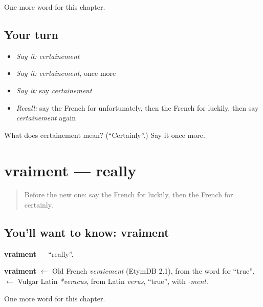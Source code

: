 \begin{grammarlens}[title={What you've built}]
One more word for this chapter.
\end{grammarlens}

\subsection*{Your turn}
\begin{itemize}
\raggedright
  \item \emph{Say it:} \emph{certainement}
  \item \emph{Say it:} \emph{certainement}, once more
  \item \emph{Say it:} say \emph{certainement}
  \item \emph{Recall:} say the French for unfortunately, then the French for luckily, then say \emph{certainement} again
\end{itemize}

\begin{tcolorbox}[breakable,colback=teal!4,colframe=teal!35!black,title={Before you move on}]
What does certainement mean? (\textquotedblleft{}Certainly\textquotedblright{}.) Say it once more.
\end{tcolorbox}
\section[vraiment]{vraiment — really}

\label{lesson:FR-C189-vraiment}



\begin{quote}
Before the new one: say the French for luckily, then the French for certainly.
\end{quote}

\subsection*{You'll want to know: vraiment}
\textbf{vraiment} — \textquotedblleft{}really\textquotedblright{}.

\begin{cousinweb}
\textbf{vraiment} $\leftarrow$ Old French \emph{veraiement} (EtymDB 2.1), from the word for \textquotedblleft{}true\textquotedblright{}, $\leftarrow$ Vulgar Latin \emph{*veracus}, from Latin \emph{verus}, \textquotedblleft{}true\textquotedblright{}, with \emph{-ment}.
\end{cousinweb}

\begin{grammarlens}[title={What you've built}]
One more word for this chapter.
\end{grammarlens}

